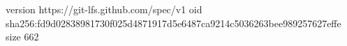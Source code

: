 version https://git-lfs.github.com/spec/v1
oid sha256:fd9d02838981730f025d4871917d5e6487ca9214c5036263bee989257627effe
size 662
